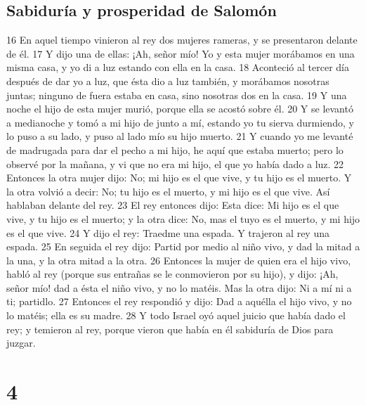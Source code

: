 \section*{Sabiduría y prosperidad de Salomón}

16 En aquel tiempo vinieron al rey dos mujeres rameras, y se presentaron delante de él.
17 Y dijo una de ellas: ¡Ah, señor mío! Yo y esta mujer morábamos en una misma casa, y yo di a luz estando con ella en la casa.
18 Aconteció al tercer día después de dar yo a luz, que ésta dio a luz también, y morábamos nosotras juntas; ninguno de fuera estaba en casa, sino nosotras dos en la casa.
19 Y una noche el hijo de esta mujer murió, porque ella se acostó sobre él.
20 Y se levantó a medianoche y tomó a mi hijo de junto a mí, estando yo tu sierva durmiendo, y lo puso a su lado, y puso al lado mío su hijo muerto.
21 Y cuando yo me levanté de madrugada para dar el pecho a mi hijo, he aquí que estaba muerto; pero lo observé por la mañana, y vi que no era mi hijo, el que yo había dado a luz.
22 Entonces la otra mujer dijo: No; mi hijo es el que vive, y tu hijo es el muerto. Y la otra volvió a decir: No; tu hijo es el muerto, y mi hijo es el que vive. Así hablaban delante del rey.
23 El rey entonces dijo: Esta dice: Mi hijo es el que vive, y tu hijo es el muerto; y la otra dice: No, mas el tuyo es el muerto, y mi hijo es el que vive.
24 Y dijo el rey: Traedme una espada. Y trajeron al rey una espada.
25 En seguida el rey dijo: Partid por medio al niño vivo, y dad la mitad a la una, y la otra mitad a la otra.
26 Entonces la mujer de quien era el hijo vivo, habló al rey (porque sus entrañas se le conmovieron por su hijo), y dijo: ¡Ah, señor mío! dad a ésta el niño vivo, y no lo matéis. Mas la otra dijo: Ni a mí ni a ti; partidlo.
27 Entonces el rey respondió y dijo: Dad a aquélla el hijo vivo, y no lo matéis; ella es su madre.
28 Y todo Israel oyó aquel juicio que había dado el rey; y temieron al rey, porque vieron que había en él sabiduría de Dios para juzgar.

\chapter{4}

